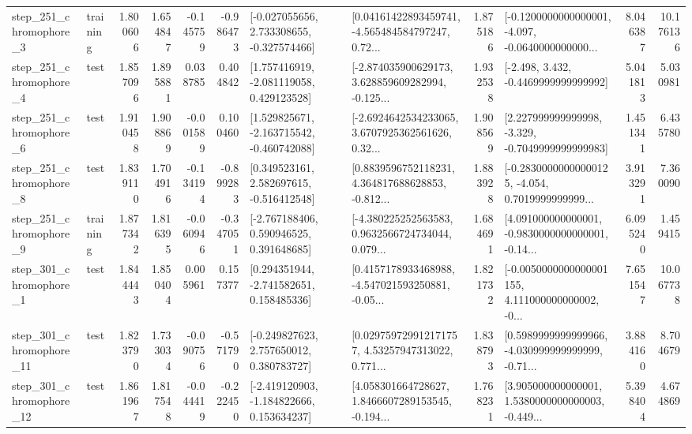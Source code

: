 \begin{tabular}{llrrrrllrlrr}
   step\_251\_chromophore\_3 &  training &      1.800606 &    1.654847 &     -0.145759 & -0.986473 &   [-0.027055656, 2.733308655, -0.327574466] &  [0.04161422893459741, -4.565484584797247, 0.72... &       1.875186 &  [-0.1200000000000001, -4.097, -0.0640000000000... &            8.046387 &         10.176136 \\
   step\_251\_chromophore\_4 &      test &      1.857096 &    1.895881 &      0.038785 &  0.404842 &    [1.757416919, -2.081119058, 0.429123528] &  [-2.874035900629173, 3.628859609282994, -0.125... &       1.932538 &               [-2.498, 3.432, -0.4469999999999992] &            5.041813 &          5.030981 \\
   step\_251\_chromophore\_6 &      test &      1.910458 &    1.908869 &     -0.001589 &  0.100460 &   [1.529825671, -2.163715542, -0.460742088] &  [-2.6924642534233065, 3.6707925362561626, 0.32... &       1.908569 &   [2.227999999999998, -3.329, -0.7049999999999983] &            1.451341 &          6.435780 \\
   step\_251\_chromophore\_8 &      test &      1.839110 &    1.704916 &     -0.134194 & -0.899283 &    [0.349523161, 2.582697615, -0.516412548] &  [0.8839596752118231, 4.364817688628853, -0.812... &       1.883928 &  [-0.28300000000000125, -4.054, 0.7019999999999... &            3.913291 &          7.360090 \\
   step\_251\_chromophore\_9 &  training &      1.877342 &    1.816395 &     -0.060946 & -0.347051 &    [-2.767188406, 0.590946525, 0.391648685] &  [-4.380225252563583, 0.9632566724734044, 0.079... &       1.684691 &  [4.091000000000001, -0.9830000000000001, -0.14... &            6.095240 &          1.459415 \\
   step\_301\_chromophore\_1 &      test &      1.844443 &    1.850404 &      0.005961 &  0.157377 &    [0.294351944, -2.741582651, 0.158485336] &  [0.4157178933468988, -4.547021593250881, -0.05... &       1.821732 &  [-0.0050000000000001155, 4.111000000000002, -0... &            7.651547 &         10.067738 \\
  step\_301\_chromophore\_11 &      test &      1.823790 &    1.733034 &     -0.090756 & -0.571790 &    [-0.249827623, 2.757650012, 0.380783727] &  [0.029759729912171757, 4.53257947313022, 0.771... &       1.838793 &  [0.5989999999999966, -4.030999999999999, -0.71... &            3.884160 &          8.704679 \\
  step\_301\_chromophore\_12 &      test &      1.861967 &    1.817548 &     -0.044419 & -0.222450 &   [-2.419120903, -1.184822666, 0.153634237] &  [4.058301664728627, 1.8466607289153545, -0.194... &       1.768231 &  [3.905000000000001, 1.5380000000000003, -0.449... &            5.398404 &          4.674869 \\

\end{tabular}
